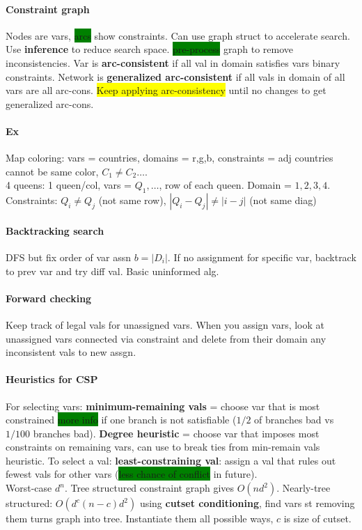 \paragraph{Constraint graph}Nodes are vars, \colorbox{green}{arcs}
show constraints. Can use graph struct to accelerate search. Use
\textbf{inference} to reduce search
space. \colorbox{green}{pre-process} graph to remove
inconsistencies. Var is \textbf{arc-consistent} if all val in domain
satisfies vars binary constraints. Network is \textbf{generalized
  arc-consistent} if all vals in domain of all vars are all
arc-cons. \colorbox{yellow}{Keep applying arc-consistency} until no
changes to get generalized arc-cons.
\paragraph{Ex} Map coloring: vars = countries, domains = r,g,b,
constraints = adj countries cannot be same color, $C_1 \neq C_2
\ldots$.
\\ 4 queens: 1 queen/col, vars = $Q_1, \ldots$, row of each
queen. Domain = ${1,2,3,4}$. Constraints: $Q_i \neq Q_j$ (not same
row), $|Q_i-Q_j| \neq |i-j|$ (not same diag)
\paragraph{Backtracking search} DFS but fix order of var assn $b =
|D_i|$. If no assignment for specific var, backtrack to prev var and
try diff val. Basic uninformed alg.
\paragraph{Forward checking} Keep track of legal vals for unassigned
vars. When you assign vars, look at unassigned vars connected via
constraint and delete from their domain any inconsistent vals to new
assgn.
\paragraph{Heuristics for CSP} For selecting vars:
\textbf{minimum-remaining vals} = choose var that is most
constrained \colorbox{green}{more info} if one branch is not
satisfiable ($1/2$ of branches bad vs $1/100$ branches bad). \textbf{Degree heuristic} = choose var that imposes most
constraints on remaining vars, can use to break ties from min-remain
vals heuristic. To select a val: \textbf{least-constraining val}:
assign a val that rules out fewest vals for other vars
(\colorbox{green}{less chance of conflict} in future).
\\ Worst-case $d^n$. Tree structured constraint graph gives
$O(nd^2)$. Nearly-tree structured: $O(d^c(n-c)d^2)$ using
\textbf{cutset conditioning}, find vars st removing them turns graph
into tree. Instantiate them all possible ways, $c$ is size of cutset.
